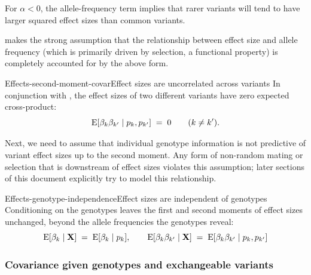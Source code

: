 \documentclass[12pt]{article}
\numberwithin{equation}{section}
\begin{document}
 For $\alpha < 0$, the allele-frequency term implies that rarer variants will tend to have larger squared effect sizes than common variants.

 makes the strong assumption that the relationship between effect size and allele frequency (which is primarily driven by selection, a functional property) is completely accounted for by the above form.

\begin{assumption}{Effects-second-moment-covar}{Effect sizes are uncorrelated across variants}
In conjunction with , the effect sizes of two different variants have zero expected cross-product:
$$ \mathrm{E}[\beta_k \beta_{k'} \mid p_k, p_{k'}] \;=\; 0 \qquad (k \neq k') . $$
\end{assumption}

Next, we need to assume that individual genotype information is not predictive of variant effect sizes up to the second moment.
Any form of non-random mating or selection that is downstream of effect sizes violates this assumption;
later sections of this document explicitly try to model this relationship.

\begin{assumption}{Effects-genotype-independence}{Effect sizes are independent of genotypes}
Conditioning on the genotypes leaves the first and second moments of effect sizes unchanged, beyond the allele frequencies the genotypes reveal:
$$ \mathrm{E}[\beta_k \mid \mathbf{X}] \;=\; \mathrm{E}[\beta_k \mid p_k], \qquad \mathrm{E}[\beta_k \beta_{k'} \mid \mathbf{X}] \;=\; \mathrm{E}[\beta_k \beta_{k'} \mid p_k, p_{k'}] $$
\end{assumption}

\subsubsection{Covariance given genotypes and exchangeable variants}
\end{document}
